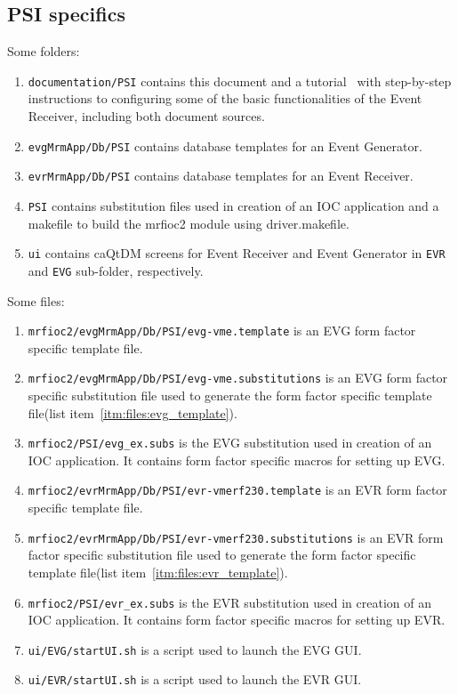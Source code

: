 \documentclass[12pt,a4paper]{article}
\begin{document}
\subsection{PSI specifics}\label{sec:PSI specifics}
Some folders:
\begin{enumerate}
\item 
	\texttt{documentation/PSI} contains this document and a tutorial~\cite{tutorial} with step-by-step instructions to configuring some of the basic functionalities of the Event Receiver, including both document sources.
\item 
	\texttt{evgMrmApp/Db/PSI} contains database templates for an Event Generator.\label{itm:folder:evg_db}

\item 
	\texttt{evrMrmApp/Db/PSI} contains database templates for an Event Receiver.\label{itm:folder:evr_db}

\item 
	\texttt{PSI} contains substitution files used in creation of an IOC application and a makefile to build the mrfioc2 module using driver.makefile.\label{itm:folder:psi}
\item 
	\texttt{ui} contains caQtDM screens for Event Receiver and Event Generator in \texttt{EVR} and \texttt{EVG} sub-folder, respectively.
\end{enumerate}
Some files:
\begin{enumerate}
\item 
	\texttt{mrfioc2/evgMrmApp/Db/PSI/evg-vme.template} is an EVG form factor specific template file.\label{itm:files:evg_template}
\item 
	\texttt{mrfioc2/evgMrmApp/Db/PSI/evg-vme.substitutions} is an EVG form factor specific substitution file used to generate the form factor specific template file(list item~\ref{itm:files:evg_template}).\label{itm:files:evg_ff_subs}
\item 
	\texttt{mrfioc2/PSI/evg\_ex.subs} is the EVG substitution used in creation of an IOC application. It contains form factor specific macros for setting up EVG.\label{itm:files:evg_substitution}
\item 
	\texttt{mrfioc2/evrMrmApp/Db/PSI/evr-vmerf230.template} is an EVR form factor specific template file.\label{itm:files:evr_template}
\item 
	\texttt{mrfioc2/evrMrmApp/Db/PSI/evr-vmerf230.substitutions} is an EVR form factor specific substitution file used to generate the form factor specific template file(list item~\ref{itm:files:evr_template}).\label{itm:files:evr_ff_subs}
\item 
	\texttt{mrfioc2/PSI/evr\_ex.subs} is the EVR substitution used in creation of an IOC application. It contains form factor specific macros for setting up EVR.\label{itm:files:evr_substitution}
\item 
	\texttt{ui/EVG/startUI.sh} is a script used to launch the EVG GUI.\label{itm:files:evg_gui}
\item 
	\texttt{ui/EVR/startUI.sh} is a script used to launch the EVR GUI.\label{itm:files:evr_gui}
\end{enumerate}
\end{document}
